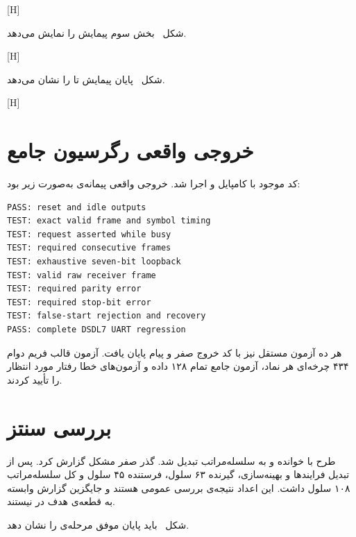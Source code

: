 [H]

شکل~ بخش سوم پیمایش را نمایش می‌دهد.

[H]

شکل~ پایان پیمایش تا  را نشان می‌دهد.

[H]

\section{خروجی واقعی رگرسیون جامع}

کد موجود با  کامپایل و اجرا شد. خروجی واقعی پیمانه‌ی
 به‌صورت زیر بود:

\begin{dsdlcodeblock}
\begin{verbatim}
PASS: reset and idle outputs
TEST: exact valid frame and symbol timing
TEST: request asserted while busy
TEST: required consecutive frames
TEST: exhaustive seven-bit loopback
TEST: valid raw receiver frame
TEST: required parity error
TEST: required stop-bit error
TEST: false-start rejection and recovery
PASS: complete DSDL7 UART regression
\end{verbatim}
\end{dsdlcodeblock}

هر ده آزمون مستقل نیز با کد خروج صفر و پیام  پایان یافت. آزمون قالب فریم دوام
۴۳۴ چرخه‌ای هر نماد، آزمون جامع تمام ۱۲۸ داده و آزمون‌های خطا رفتار مورد انتظار را تأیید
کردند.

\section{بررسی سنتز}

طرح با  خوانده و به سلسله‌مراتب  تبدیل شد. گذر
 صفر مشکل گزارش کرد. پس از تبدیل فرایندها و بهینه‌سازی، گیرنده ۶۳ سلول، فرستنده
۴۵ سلول و کل سلسله‌مراتب ۱۰۸ سلول داشت. این اعداد نتیجه‌ی بررسی عمومی  هستند و
جایگزین گزارش وابسته به قطعه‌ی هدف در  نیستند.

شکل~ باید پایان موفق مرحله‌ی  را نشان دهد.

